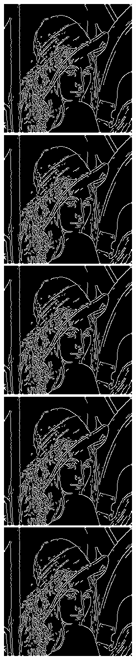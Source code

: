 \documentclass{ee208report}
\begin{document}
\begin{figure}[H]
    \centering
    \includegraphics[width=0.35\linewidth]{images/low_threshold/20.png}
    \includegraphics[width=0.35\linewidth]{images/low_threshold/30.png}
    \includegraphics[width=0.35\linewidth]{images/low_threshold/40.png}
    \includegraphics[width=0.35\linewidth]{images/low_threshold/50.png}
    \includegraphics[width=0.35\linewidth]{images/low_threshold/60.png}

\end{figure}
\end{document}
